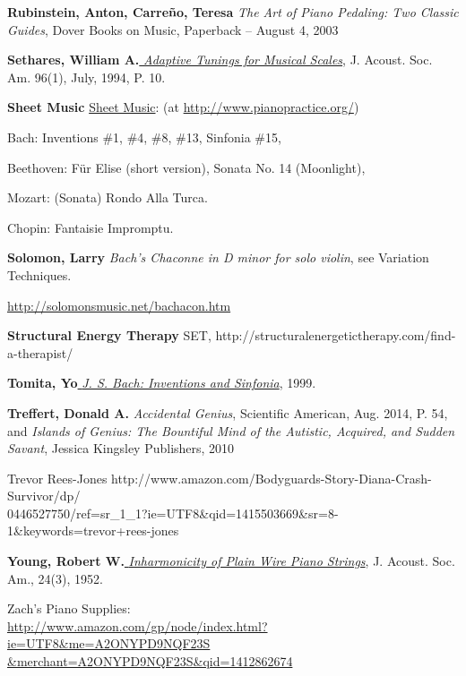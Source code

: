 \documentclass[11pt,a4paper]{book}
\begin{document}
{\textbf{Rubinstein, Anton, Carreño, Teresa}}
\emph{The Art of Piano Pedaling: Two Classic Guides}, Dover Books on
Music, Paperback -- August 4, 2003

{\textbf{Sethares, William
A.}\href{http://sethares.engr.wisc.edu/papers/adaptun.html}{{
\emph{Adaptive Tunings for Musical Scales}}}}, J. Acoust. Soc. Am.
96(1), July, 1994, P. 10.{~}

\textbf{\hypertarget{r:sheet-music}{Sheet Music}} \href{http://www.pianopractice.org/sheetmusic2.pdf}{Sheet
Music}: (at \href{http://www.pianopractice.org/}{http://www.pianopractice.org/})

Bach: Inventions \#1, \#4, \#8, \#13, Sinfonia \#15,

Beethoven: Für Elise (short version), Sonata No. 14 (Moonlight),{~}

Mozart: (Sonata) Rondo Alla Turca.{~}

Chopin: Fantaisie Impromptu.

{\textbf{Solomon, Larry}} \emph{Bach's Chaconne
in D minor for solo violin}, see Variation Techniques.

\href{http://solomonsmusic.net/bachacon.htm}{http://solomonsmusic.net/bachacon.htm}

{\textbf{Structural Energy Therapy}} SET,
http://structuralenergetictherapy.com/find-a-therapist/

\textbf{Tomita,
Yo}\href{http://www.music.qub.ac.uk/tomita/essay/inventions.html}{{
\emph{J. S. Bach: Inventions and Sinfonia}}}{, 1999.}

{\textbf{Treffert, Donald A.}} \emph{Accidental
Genius}, Scientific American, Aug. 2014, P. 54, and \emph{Islands of
Genius: The Bountiful Mind of the Autistic, Acquired, and Sudden
Savant}, Jessica Kingsley Publishers, 2010

Trevor Rees-Jones http://www.amazon.com/Bodyguards-Story-Diana-Crash-Survivor/dp/\\0446527750/ref=sr\_1\_1?ie=UTF8\&qid=1415503669\&sr=8-1\&keywords=trevor+rees-jones

{\textbf{Young, Robert
W.}\href{http://www.afn.org/\%7Eafn49304/youngnew.htm}{{
\emph{Inharmonicity of Plain Wire Piano Strings}}}}, J. Acoust. Soc.
Am., 24(3), 1952.

Zach's Piano Supplies:\\
\href{http://www.amazon.com/gp/node/index.html?ie=UTF8\&me=A2ONYPD9NQF23S\&merchant=A2ONYPD9NQF23S\&qid=1412862674}{
http://www.amazon.com/gp/node/index.html?ie=UTF8\&me=A2ONYPD9NQF23S\\\&merchant=A2ONYPD9NQF23S\&qid=1412862674}
\end{document}
